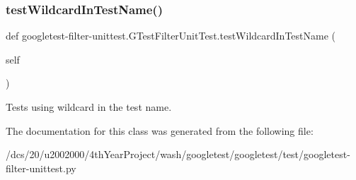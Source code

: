 \subsubsection{\texorpdfstring{test\+Wildcard\+In\+Test\+Name()}{testWildcardInTestName()}}
{\footnotesize\ttfamily def googletest-\/filter-\/unittest.\+G\+Test\+Filter\+Unit\+Test.\+test\+Wildcard\+In\+Test\+Name (\begin{DoxyParamCaption}\item[{}]{self }\end{DoxyParamCaption})}

\begin{DoxyVerb}Tests using wildcard in the test name.\end{DoxyVerb}
 

The documentation for this class was generated from the following file\+:\begin{DoxyCompactItemize}
\item 
/dcs/20/u2002000/4th\+Year\+Project/wash/googletest/googletest/test/googletest-\/filter-\/unittest.\+py\end{DoxyCompactItemize}
